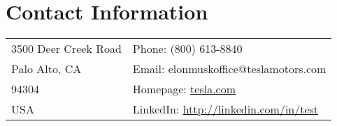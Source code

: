 \documentclass[10pt]{article}
\begin{document}
        

    


    \section{Contact Information}
    
    \setlength{\tabcolsep}{18pt}

    \begin{center}
        \begin{tabular}{ll}
            3500 Deer Creek Road & Phone: (800) 613-8840 \\
            Palo Alto, CA & Email: elonmuskoffice@teslamotors.com \\
            94304 & Homepage: \url{tesla.com} \\
            USA & LinkedIn: \url{http://linkedin.com/in/test}
        \end{tabular}
    \end{center}
\end{document}
